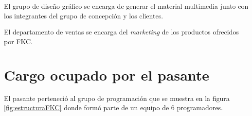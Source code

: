 El grupo de diseño gráfico se encarga de generar el material multimedia junto con los integrantes del grupo de concepción y los clientes. 

El departamento de ventas se encarga del \emph{marketing} de los productos ofrecidos por \gls{FKC}.

\section{Cargo ocupado por el pasante} 

El pasante perteneció al grupo de programación que se muestra en la figura \ref{fig:estructuraFKC} donde formó parte de un equipo de 6 programadores.



